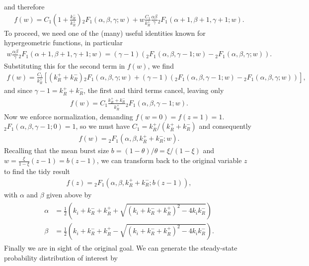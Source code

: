 \documentclass[12pt]{article}%
\begin{document}
and therefore
\begin{align}
f(w) = C_1\left(1 + \frac{k_R^-}{k_R^+}\right)
        {_2F_1}(\alpha, \beta, \gamma; w)
+ w \frac{C_1}{k_R^+} \frac{\alpha\beta}{\gamma}
        {_2F_1}(\alpha+1, \beta+1, \gamma+1; w).
\end{align}
To proceed, we need one of the (many) useful identities known for
hypergeometric functions, in particular
\begin{align}
w\frac{\alpha\beta}{\gamma} {_2F_1}(\alpha+1, \beta+1, \gamma+1; w)
=
(\gamma-1)\left(
{_2F_1}(\alpha, \beta, \gamma-1; w) - {_2F_1}(\alpha, \beta, \gamma; w)
\right).
\end{align}
Substituting this for the second term in $f(w)$, we find
\begin{align}
f(w) = \frac{C_1}{k_R^+}
\left[
        \left(k_R^+ + k_R^-\right)
        {_2F_1}(\alpha, \beta, \gamma; w)
+ (\gamma-1)\left(
        {_2F_1}(\alpha, \beta, \gamma-1; w) - {_2F_1}(\alpha, \beta, \gamma; w)
        \right)
\right],
\end{align}
and since $\gamma-1 = k_R^+ + k_R^-$, the first and third terms cancel,
leaving only
\begin{align}
f(w) = C_1\frac{k_R^+ + k_R^-}{k_R^+} {_2F_1}(\alpha, \beta, \gamma-1; w).
\end{align}
Now we enforce normalization, demanding $f(w=0) = f(z=1) = 1$.
${_2F_1}(\alpha, \beta, \gamma-1; 0) = 1$, so we must have
$C_1 = k_R^+ / (k_R^+ + k_R^-)$ and consequently
\begin{align}
f(w) =  {_2F_1}(\alpha, \beta, k_R^+ + k_R^-; w).
\end{align}
Recalling that the mean burst size $b = (1-\theta)/\theta = \xi/(1-\xi)$
and $w = \frac{\xi}{1-\xi} (z-1) = b (z-1)$,
we can transform back to the original variable $z$ to find the tidy result
\begin{align}
f(z) =  {_2F_1}(\alpha, \beta, k_R^+ + k_R^-; b(z-1)),
\end{align}
with $\alpha$ and $\beta$ given above by
\begin{align}
\begin{split}
\alpha &= \frac{1}{2}
\left(k_i+k_R^-+k_R^+ + \sqrt{(k_i+k_R^-+k_R^+)^2 - 4k_i k_R^-}\right)
\\
\beta &= \frac{1}{2}
\left(k_i+k_R^-+k_R^+ - \sqrt{(k_i+k_R^-+k_R^+)^2 - 4k_i k_R^-}\right).
\end{split}
\end{align}
Finally we are in sight of the original goal. We can generate the
steady-state probability distribution of interest by
\end{document}
